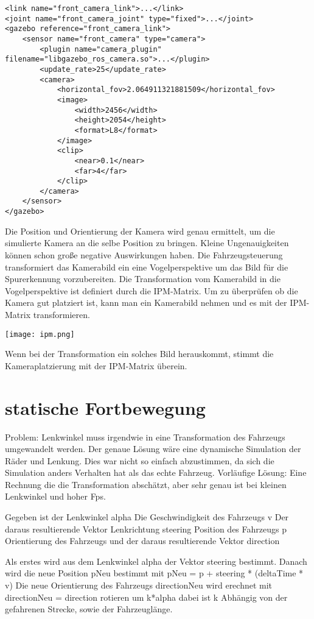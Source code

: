 \begin{lstlisting}
<link name="front_camera_link">...</link>
<joint name="front_camera_joint" type="fixed">...</joint>
<gazebo reference="front_camera_link">
    <sensor name="front_camera" type="camera">
        <plugin name="camera_plugin" filename="libgazebo_ros_camera.so">...</plugin>
        <update_rate>25</update_rate>
        <camera>
            <horizontal_fov>2.064911321881509</horizontal_fov>
            <image>
                <width>2456</width>
                <height>2054</height>
                <format>L8</format>
            </image>
            <clip>
                <near>0.1</near>
                <far>4</far>
            </clip>
        </camera>
    </sensor>
</gazebo>
\end{lstlisting}
Die Position und Orientierung der Kamera wird genau ermittelt, um die simulierte Kamera an die selbe Position zu bringen.
Kleine Ungenauigkeiten können schon große negative Auswirkungen haben. 
Die Fahrzeugsteuerung transformiert das Kamerabild ein eine Vogelperspektive um das Bild für die Spurerkennung vorzubereiten.
Die Transformation vom Kamerabild in die Vogelperspektive ist definiert durch die IPM-Matrix.
Um zu überprüfen ob die Kamera gut platziert ist, kann man ein Kamerabild nehmen und es mit der IPM-Matrix transformieren. 
\begin{center}
    \texttt{[image: ipm.png]}
\end{center}
Wenn bei der Transformation ein solches Bild herauskommt, stimmt die Kameraplatzierung mit der IPM-Matrix überein.



\section{statische Fortbewegung}
Problem: Lenkwinkel muss irgendwie in eine Transformation des Fahrzeugs umgewandelt werden.
Der genaue Lösung wäre eine dynamische Simulation der Räder und Lenkung.
Dies war nicht so einfach abzustimmen, da sich die Simulation anders Verhalten hat als das echte Fahrzeug.
Vorläufige Lösung: Eine Rechnung die die Transformation abschätzt, aber sehr genau ist bei kleinen Lenkwinkel und hoher Fps.

Gegeben ist der Lenkwinkel alpha
Die Geschwindigkeit des Fahrzeugs v
Der daraus resultierende Vektor Lenkrichtung steering
Position des Fahrzeugs p
Orientierung des Fahrzeugs und der daraus resultierende Vektor direction

Als erstes wird aus dem Lenkwinkel alpha der Vektor steering bestimmt.
Danach wird die neue Position pNeu bestimmt mit pNeu = p + steering * (deltaTime * v)
Die neue Orientierung des Fahrzeugs directionNeu wird erechnet mit directionNeu = direction rotieren um k*alpha
dabei ist k Abhängig von der gefahrenen Strecke, sowie der Fahrzeuglänge.


